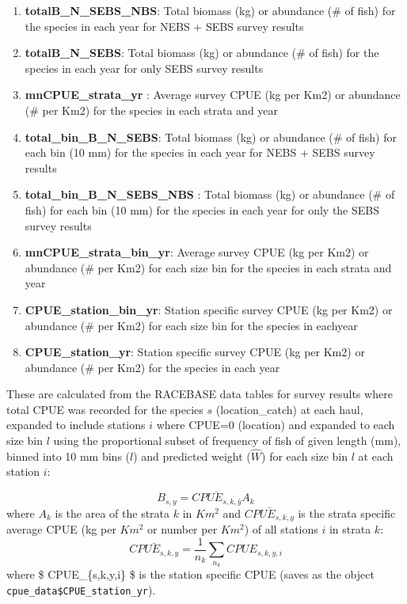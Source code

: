 \documentclass[
]{article}
\begin{document}
\begin{enumerate}
\def\labelenumi{\arabic{enumi}.}
\item
  \textbf{totalB\_N\_SEBS\_NBS}: Total biomass (kg) or abundance (\# of
  fish) for the species in each year for NEBS + SEBS survey results\\
\item
  \textbf{totalB\_N\_SEBS}: Total biomass (kg) or abundance (\# of fish)
  for the species in each year for only SEBS survey results
\item
  \textbf{mnCPUE\_strata\_yr} : Average survey CPUE (kg per Km2) or
  abundance (\# per Km2) for the species in each strata and year
\item
  \textbf{total\_bin\_B\_N\_SEBS}: Total biomass (kg) or abundance (\#
  of fish) for each bin (10 mm) for the species in each year for NEBS +
  SEBS survey results
\item
  \textbf{total\_bin\_B\_N\_SEBS\_NBS} : Total biomass (kg) or abundance
  (\# of fish) for each bin (10 mm) for the species in each year for
  only the SEBS survey results
\item
  \textbf{mnCPUE\_strata\_bin\_yr}: Average survey CPUE (kg per Km2) or
  abundance (\# per Km2) for each size bin for the species in each
  strata and year
\item
  \textbf{CPUE\_station\_bin\_yr}: Station specific survey CPUE (kg per
  Km2) or abundance (\# per Km2) for each size bin for the species in
  eachyear
\item
  \textbf{CPUE\_station\_yr}: Station specific survey CPUE (kg per Km2)
  or abundance (\# per Km2) for the species in each year
\end{enumerate}

These are calculated from the RACEBASE data tables for survey results
where total CPUE was recorded for the species \(s\) (location\_catch) at
each haul, expanded to include stations \(i\) where CPUE=0 (location)
and expanded to each size bin \(l\) using the proportional subset of
frequency of fish of given length (mm), binned into 10 mm bins (\(l\))
and predicted weight (\(\hat{W}\)) for each size bin \(l\) at each
station \(i\):

\[B_{s,y} =  \bar{CPUE_{s,k,y}} \dot{}A_{k}\] where \(A_{k}\) is the
area of the strata \(k\) in \(Km^2\) and \(\bar{CPUE_{s,k,y}}\) is the
strata specific average CPUE (kg per \(Km^2\) or number per \(Km^2\)) of
all stations \(i\) in strata \(k\):
\[\bar{CPUE_{s,k,y}} = \frac{1}{n_k}\dot{}\sum_{n_k}{CPUE_{s,k,y,i}}\]
where \$ CPUE\_\{s,k,y,i\} \$ is the station specific CPUE (saves as the
object \texttt{cpue\_data\$CPUE\_station\_yr}).
\end{document}
